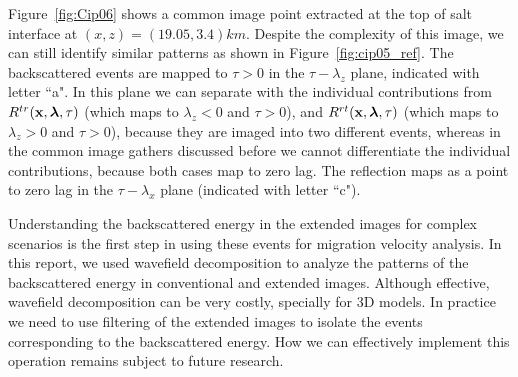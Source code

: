 Figure~\ref{fig:Cip06} shows a common image point extracted at the top of salt interface at $(x,z)=(19.05,3.4)km$. Despite the complexity of this image, we can still
identify similar patterns as shown in Figure~\ref{fig:cip05_ref}. The backscattered events are mapped to $\tau>0$ in the
$\tau-\lambda_z$ plane, indicated with letter ``a". In this plane we can separate with the individual contributions 
from $R^{tr}({\bf x},{\boldsymbol{\lambda}},\tau)$ (which maps to $\lambda_z<0$ and $\tau>0$), and $R^{rt}({\bf x},{\boldsymbol{\lambda}},\tau)$ (which maps to $\lambda_z>0$ and $\tau>0$), because they are imaged into two different events, 
whereas in the common image gathers discussed before we cannot differentiate the individual
contributions, because both cases map to zero lag. The reflection maps as a point to zero lag in the $\tau-\lambda_x$ plane (indicated with letter ``c"). 

Understanding the backscattered energy in the extended images for complex scenarios is the first step in using these events for 
migration velocity analysis. In this report, we used wavefield decomposition to analyze the patterns of the backscattered energy in conventional and extended images.
 Although effective, wavefield decomposition can be very costly, specially for 3D models. In practice we need to use filtering of the extended images to isolate the events corresponding to 
the backscattered energy. How we can effectively  implement this operation remains subject to future research.

